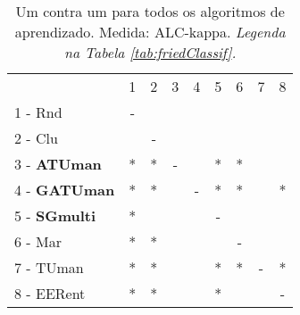 \begin{table}[h]
\caption{Um contra um para todos os algoritmos de aprendizado. Medida: ALC-kappa. \textit{Legenda na Tabela \ref{tab:friedClassif}.}}
\begin{center}\begin{tabular}{lcc|cc|cc|cc}
 			& 1 & 2 & 3 & 4 & 5 & 6 & 7 & 8\\
1 - Rnd  	& - &   &   &   &   &   &   &   \\
2 - Clu  	&   & - &   &   &   &   &   &   \\ \hline
3 - \textbf{ATUman}	& * & * & - &   & * & * &   &   \\
4 - \textbf{GATUman}	& * & * &   & - & * & * &   & * \\ \hline
5 - \textbf{SGmulti}	& * &   &   &   & - &   &   &   \\
6 - Mar  	& * & * &   &   &   & - &   &   \\ \hline
7 - TUman	& * & * &   &   & * & * & - & * \\
8 - EERent	& * & * &   &   & * &   &   & - \\ \hline\end{tabular}
\label{stratsALCKappaFriedAllReduxall}
\end{center}
\end{table}